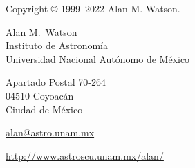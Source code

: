 
\noindent
Copyright {\copyright} 1999--2022 Alan M. Watson.


\bigskip
\bigskip

\noindent
Alan M.\ Watson\\
Instituto de Astronomía\\
Universidad Nacional Autónomo de México

\medskip
\noindent
Apartado Postal 70-264\\
04510 Coyoacán\\
Ciudad de México

\medskip
\noindent
\href{mailto:alan@astro.unam.mx}{alan@astro.unam.mx}

\medskip
\noindent
\href{http://www.astroscu.unam.mx/~alan/}{http://www.astroscu.unam.mx/\raisebox{-3pt}{\~\relax}alan/}

\bigskip
\bigskip






